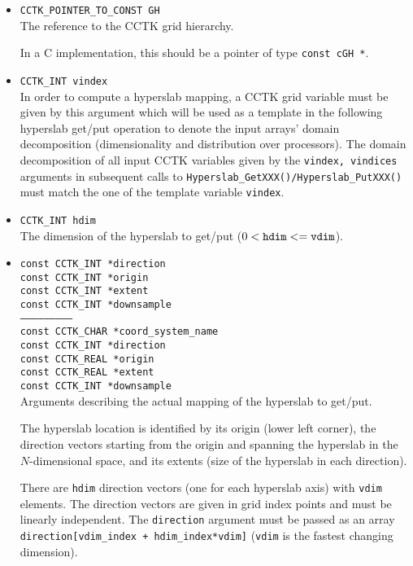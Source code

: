 \documentclass{article}
\begin{document}
\begin{itemize}
  \item{\tt CCTK\_POINTER\_TO\_CONST GH}\\
    The reference to the CCTK grid hierarchy.

    In a C implementation, this should be a pointer of type {\tt const cGH *}.

  \item{\tt CCTK\_INT vindex}\\
    In order to compute a hyperslab mapping, a CCTK grid variable must be given
    by this argument which will be used as a template in the following
    hyperslab get/put operation to denote the input arrays' domain
    decomposition (dimensionality and distribution over processors).
    The domain decomposition of all input CCTK variables given by the
    {\tt vindex, vindices} arguments in subsequent calls to
    {\tt Hyperslab\_GetXXX()/Hyperslab\_PutXXX()} must match the one of the
    template variable {\tt vindex}.

  \item{\tt CCTK\_INT hdim}\\
    The dimension of the hyperslab to get/put ($0 < {\tt hdim} <= {\tt vdim}$).

  \item{\tt const CCTK\_INT *direction\\
    const CCTK\_INT *origin\\
    const CCTK\_INT *extent\\
    const CCTK\_INT *downsample\\
    --------------------------\\
    const CCTK\_CHAR *coord\_system\_name\\
    const CCTK\_INT  *direction\\
    const CCTK\_REAL *origin\\
    const CCTK\_REAL *extent\\
    const CCTK\_INT  *downsample}\\
    Arguments describing the actual mapping of the hyperslab to get/put.

    The hyperslab location is identified by its origin (lower left corner),
    the direction vectors starting from the origin and spanning the hyperslab
    in the $N$-dimensional space, and its extents (size of the hyperslab in
    each direction).

    There are {\tt hdim} direction vectors (one for each hyperslab axis) with
    {\tt vdim} elements. The direction vectors are given in grid index points and must
    be linearly independent. The {\tt direction} argument must
    be passed as an array {\tt direction[vdim\_index + hdim\_index*vdim]}
    ({\tt vdim} is the fastest changing dimension).


\end{itemize}
\end{document}
